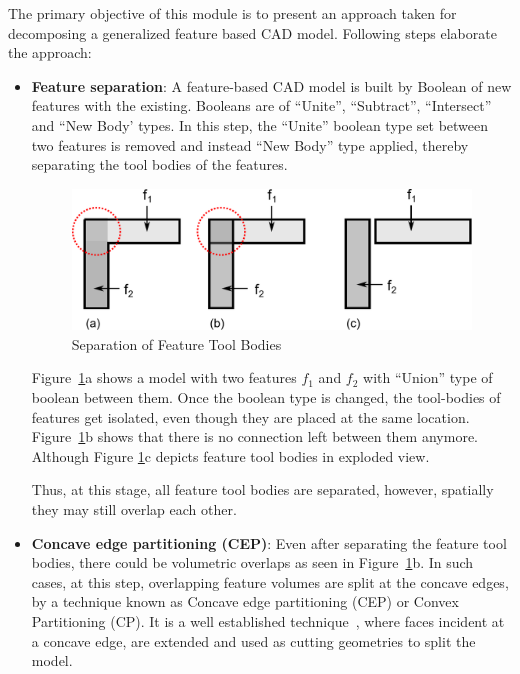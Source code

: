 The primary objective of this module is to present an approach taken for decomposing a generalized feature based CAD model. Following steps elaborate the approach:
\begin{itemize}[noitemsep,topsep=2pt,parsep=2pt,partopsep=2pt]
\item \textbf{Feature separation}: A feature-based CAD model is built by Boolean of new features with the existing. Booleans are of ``Unite'', ``Subtract'', ``Intersect'' and ``New Body' types.  In this step, the ``Unite'' boolean type set between two features is removed and instead ``New Body'' type applied, thereby separating the tool bodies of the features.



  \begin{figure}[!h]
\centering     %
\includegraphics[width=0.75\linewidth,valign=t]{images/newbody_bw.pdf}
\caption{Separation of Feature Tool Bodies}
\label{fig:litsurvey:newbody}
\end{figure}



Figure~\ref{fig:litsurvey:newbody}a shows a model with two features $f_1$ and $f_2$ with ``Union'' type of boolean between them. Once the boolean type is changed, the tool-bodies of features get isolated, even though they are placed at the same location. Figure~\ref{fig:litsurvey:newbody}b shows that there is no connection left between them anymore.  Although Figure \ref{fig:litsurvey:newbody}c  depicts feature tool bodies in exploded view.%

 Thus, at this stage, all feature tool bodies are separated, however, spatially they may still overlap each other.
\item \textbf{Concave edge partitioning (CEP)}:  Even after separating the feature tool bodies, there could be volumetric overlaps as seen in Figure~\ref{fig:litsurvey:newbody}b. In such cases, at this step, overlapping feature volumes are split at the concave edges, by a technique known as Concave edge partitioning (CEP) or Convex Partitioning (CP). It is a well established technique~\cite{Woo2002, Woo2003, Woo2003a, Woo2006, Woo2009}, where faces incident at a concave edge, are extended and used as cutting geometries to split the model.


\end{itemize}
